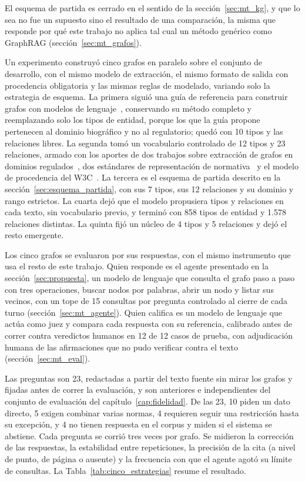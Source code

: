 \documentclass[12pt,a4paper]{report}
\begin{document}
El esquema de partida es cerrado en el sentido de la sección~\ref{sec:mt_kg}, y que lo sea no fue un supuesto sino el resultado de una comparación, la misma que responde por qué este trabajo no aplica tal cual un método genérico como GraphRAG (sección~\ref{sec:mt_grafos}).

Un experimento construyó cinco grafos en paralelo sobre el conjunto de desarrollo, con el mismo modelo de extracción, el mismo formato de salida con procedencia obligatoria y las mismas reglas de modelado, variando solo la estrategia de esquema. La primera siguió una guía de referencia para construir grafos con modelos de lenguaje~\cite{anthropic2026cookbook}, conservando su método completo y reemplazando solo los tipos de entidad, porque los que la guía propone pertenecen al dominio biográfico y no al regulatorio; quedó con 10 tipos y las relaciones libres. La segunda tomó un vocabulario controlado de 12 tipos y 23 relaciones, armado con los aportes de dos trabajos sobre extracción de grafos en dominios regulados~\cite{arun2025finreflect,agarwal2025ragulating}, dos estándares de representación de normativa~\cite{hoekstra2007lkif,palmirani2018akomantoso} y el modelo de procedencia del W3C~\cite{lebo2013provo}. La tercera es el esquema de partida descrito en la sección~\ref{sec:esquema_partida}, con sus 7 tipos, sus 12 relaciones y su dominio y rango estrictos. La cuarta dejó que el modelo propusiera tipos y relaciones en cada texto, sin vocabulario previo, y terminó con 858 tipos de entidad y 1.578 relaciones distintas. La quinta fijó un núcleo de 4 tipos y 5 relaciones y dejó el resto emergente.

Los cinco grafos se evaluaron por sus respuestas, con el mismo instrumento que usa el resto de este trabajo. Quien responde es el agente presentado en la sección~\ref{sec:propuesta}, un modelo de lenguaje que consulta el grafo paso a paso con tres operaciones, buscar nodos por palabras, abrir un nodo y listar sus vecinos, con un tope de 15 consultas por pregunta controlado al cierre de cada turno (sección~\ref{sec:mt_agente}). Quien califica es un modelo de lenguaje que actúa como juez y compara cada respuesta con su referencia, calibrado antes de correr contra veredictos humanos en 12 de 12 casos de prueba, con adjudicación humana de las afirmaciones que no pudo verificar contra el texto (sección~\ref{sec:mt_eval}).

Las preguntas son 23, redactadas a partir del texto fuente sin mirar los grafos y fijadas antes de correr la evaluación, y son anteriores e independientes del conjunto de evaluación del capítulo~\ref{cap:fidelidad}. De las 23, 10 piden un dato directo, 5 exigen combinar varias normas, 4 requieren seguir una restricción hasta su excepción, y 4 no tienen respuesta en el corpus y miden si el sistema se abstiene. Cada pregunta se corrió tres veces por grafo. Se midieron la corrección de las respuestas, la estabilidad entre repeticiones, la precisión de la cita (a nivel de punto, de página o ausente) y la frecuencia con que el agente agotó su límite de consultas. La Tabla~\ref{tab:cinco_estrategias} resume el resultado.
\end{document}
